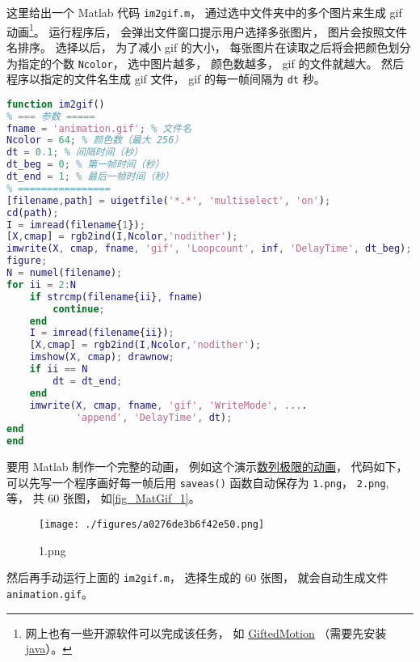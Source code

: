 

这里给出一个 Matlab 代码 \verb|im2gif.m|， 通过选中文件夹中的多个图片来生成 gif 动画\footnote{网上也有一些开源软件可以完成该任务， 如 \href{http://www.onyxbits.de/giftedmotion}{GiftedMotion} （需要先安装 \href{https://www.java.com/download/ie_manual.jsp}{java}）。}。 运行程序后， 会弹出文件窗口提示用户选择多张图片， 图片会按照文件名排序。 选择以后， 为了减小 gif 的大小， 每张图片在读取之后将会把颜色划分为指定的个数 \verb|Ncolor|， 选中图片越多， 颜色数越多， gif 的文件就越大。 然后程序以指定的文件名生成 gif 文件， gif 的每一帧间隔为 \verb|dt| 秒。

\begin{lstlisting}[language=matlab, caption=im2gif.m]
function im2gif()
% === 参数 =====
fname = 'animation.gif'; % 文件名
Ncolor = 64; % 颜色数（最大 256）
dt = 0.1; % 间隔时间（秒）
dt_beg = 0; % 第一帧时间（秒）
dt_end = 1; % 最后一帧时间（秒）
% ================
[filename,path] = uigetfile('*.*', 'multiselect', 'on');
cd(path);
I = imread(filename{1});
[X,cmap] = rgb2ind(I,Ncolor,'nodither');
imwrite(X, cmap, fname, 'gif', 'Loopcount', inf, 'DelayTime', dt_beg);
figure;
N = numel(filename);
for ii = 2:N
    if strcmp(filename{ii}, fname)
        continue;
    end
    I = imread(filename{ii});
    [X,cmap] = rgb2ind(I,Ncolor,'nodither');
    imshow(X, cmap); drawnow;
    if ii == N
        dt = dt_end;
    end
    imwrite(X, cmap, fname, 'gif', 'WriteMode', ....
            'append', 'DelayTime', dt);
end
end
\end{lstlisting}

要用 Matlab 制作一个完整的动画， 例如这个演示\href{https://wuli.wiki/apps/Lim0.html}{数列极限的动画}， 代码如下， 可以先写一个程序画好每一帧后用 \verb|saveas()| 函数自动保存为 \verb|1.png|， \verb|2.png|, 等， 共 60 张图， 如\autoref{fig_MatGif_1}。
\begin{figure}[ht]
\centering
\texttt{[image: ./figures/a0276de3b6f42e50.png]}
\caption{1.png} \label{fig_MatGif_1}
\end{figure}
然后再手动运行上面的 \verb|im2gif.m|， 选择生成的 60 张图， 就会自动生成文件 \verb|animation.gif|。

